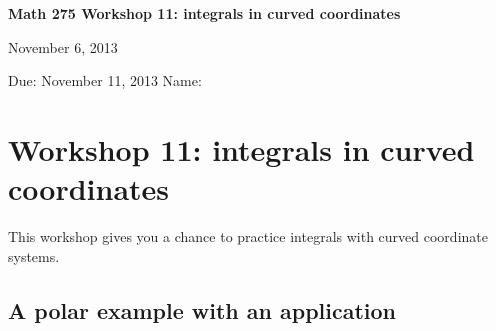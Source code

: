 \documentclass[12pt]{exam}
\theoremstyle{definition}
\begin{document}
\noindent
\textbf{{\large Math 275 \hfill Workshop 11: integrals in curved coordinates}}

\noindent
November 6, 2013 

\noindent
Due: November 11, 2013 \hfill Name: \underline{\hspace{3in}} 

\noindent

\section{Workshop 11: integrals in curved coordinates}

This workshop gives you a chance to practice integrals with curved
coordinate systems.

\subsection{A polar example with an application}
\end{document}
